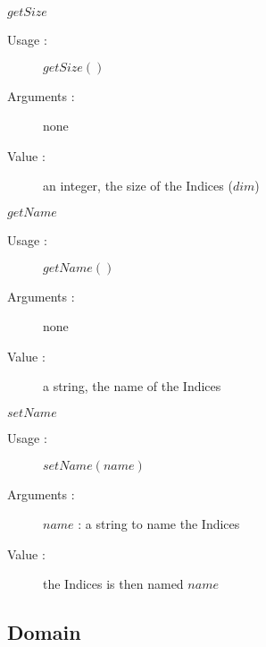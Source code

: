 \begin{description}
\begin{description}
  \item $getSize$
    \begin{description}
    \item[Usage :] $getSize()$
    \item[Arguments :] none
    \item[Value :] an integer, the size of the Indices ($dim$)
    \end{description}
    \bigskip


  \item $getName$
    \begin{description}
    \item[Usage :] $getName()$
    \item[Arguments :] none
    \item[Value :] a string, the name of the Indices
    \end{description}
    \bigskip

  \item $setName$
    \begin{description}
    \item[Usage :] $setName(name)$
    \item[Arguments :] $name$ : a string to name the Indices
    \item[Value :] the Indices is then named $name$
    \end{description}
    \bigskip

  \end{description}
\end{description}


\newpage \subsection{Domain}

